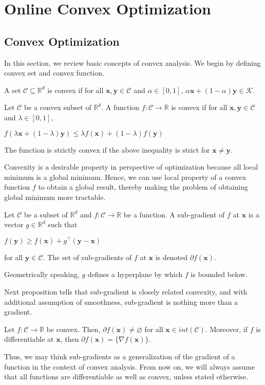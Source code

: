 \documentclass[12pt, a4paper]{report}
\begin{document}
\chapter{Online Convex Optimization}
\label{Chap2}
\section{Convex Optimization}
In this section, we review basic concepts of convex analysis. We begin by defining convex set and convex function.
\begin{defn}
A set $ \mathcal{C} \subseteq \mathbb{R}^{d} $ is convex if for all $\mathbf{x}, \mathbf{y} \in \mathcal{C}$ and $\alpha \in [0, 1]$, $\alpha \mathbf{x} + (1 - \alpha) \mathbf{y} \in \mathcal{K}$.
\end{defn}
\begin{defn}
Let $\mathcal{C}$ be a convex subset of $\mathbb{R}^d$. A function $f: \mathcal{C} \rightarrow \mathbb{R}$ is convex if for all $\mathbf{x}, \mathbf{y} \in \mathcal{C}$ and $\lambda \in [0, 1]$,
\begin{center}
    $f(\lambda \mathbf{x} + (1-\lambda) \mathbf{y}) \leq \lambda f(\mathbf{x}) + (1 - \lambda)f(\mathbf{y})$
\end{center}
The function is strictly convex if the above inequality is strict for $\mathbf{x} \neq \mathbf{y}$.
\end{defn}
Convexity is a desirable property in perspective of optimization because all local minimum is a global minimum. Hence, we can use local property of a convex function $f$ to obtain a global result, thereby making the problem of obtaining global minimum more tractable.

\begin{defn}
Let $\mathcal{C}$ be a subset of $\mathbb{R}^d$ and $f: \mathcal{C} \rightarrow \mathbb{R}$ be a function. A sub-gradient of $f$ at $\mathbf{x}$ is a vector $g \in \mathbb{R}^d$ such that
\begin{center}
    $f(\mathbf{y}) \geq f(\mathbf{x}) + g^\top(\mathbf{y} - \mathbf{x})$
\end{center}
for all $\mathbf{y} \in \mathcal{C}$. The set of sub-gradients of $f$ at $\mathbf{x}$ is denoted $ \partial f(\mathbf{x})$.
\end{defn}
Geometrically speaking, $g$ defines a hyperplane by which $f$ is bounded below.

Next proposition tells that sub-gradient is closely related convexity, and with additional assumption of smoothness, sub-gradient is nothing more than a gradient.
\begin{prop} \label{prop:grad-is-subgrad}
Let $f: \mathcal{C} \rightarrow \mathbb{R}$ be convex. Then, $\partial f(\mathbf{x}) \neq \varnothing$ for all $\mathbf{x} \in int(\mathcal{C})$. Moreover, if $f$ is differentiable at $\mathbf{x}$, then $\partial f(\mathbf{x}) = \{\nabla f(\mathbf{x})\}$.
\end{prop}
Thus, we may think sub-gradients as a generalization of the gradient of a function in the context of convex analysis. From now on, we will always assume that all functions are differentiable as well as convex, unless stated otherwise.  
\end{document}
